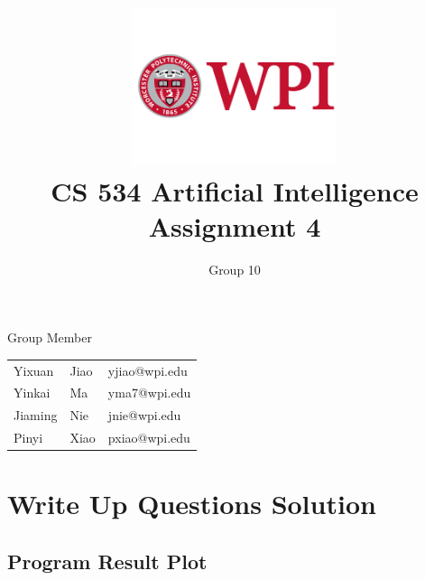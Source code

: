 \documentclass[11pt, a4paper]{article}
\title{\includegraphics[width=0.45\textwidth]{wpi2}
	\\CS 534 Artificial Intelligence \\ Assignment 4 }          %
\author{Group 10 }                    %
\begin{document}
	\begin{titlepage}
		
		\maketitle
		
		\begin{center}
			Group Member
		\end{center}
		
		\begin{table}[htbp] 
			\begin{center}
				\begin{tabular}{l l l} 
					
					Yixuan & Jiao  &   yjiao@wpi.edu \\
					Yinkai & Ma  &   yma7@wpi.edu \\
					Jiaming & Nie  &  jnie@wpi.edu \\
					Pinyi & Xiao  &  pxiao@wpi.edu \\
				\end{tabular}
			\end{center}
		\end{table}
		
		
		
		\thispagestyle{empty}  %
		
	\end{titlepage}














  
% 

\section{Write Up Questions Solution}

\subsection{Program Result Plot}
\end{document}
